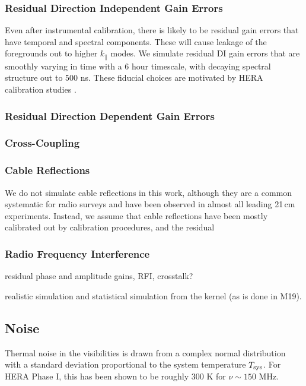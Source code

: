 \documentclass[a4paper,fleqn,usenatbib]{mnras}
\def\kpara{k_{\parallel}}
\begin{document}
\subsubsection{Residual Direction Independent Gain Errors}
Even after instrumental calibration, there is likely to be residual gain errors that have temporal and spectral components.
These will cause leakage of the foregrounds out to higher $\kpara$ modes.
We simulate residual DI gain errors that are smoothly varying in time with a 6 hour timescale, with decaying spectral structure out to 500 ns.
These fiducial choices are motivated by HERA calibration studies \citep{Kern2020a, Kern2020b}.


\subsubsection{Residual Direction Dependent Gain Errors}


\subsubsection{Cross-Coupling}


\subsubsection{Cable Reflections}
We do not simulate cable reflections in this work, although they are a common systematic for radio surveys and have been observed in almost all leading 21\,cm experiments.
Instead, we assume that cable reflections have been mostly calibrated out by calibration procedures, and the residual


\subsubsection{Radio Frequency Interference}


residual phase and amplitude gains, RFI, crosstalk?

realistic simulation and statistical simulation from the kernel (as is done in M19).


\subsection{Noise}
Thermal noise in the visibilities is drawn from a complex normal distribution with a standard deviation proportional to the system temperature $T_{\rm sys}$.
For HERA Phase I, this has been shown to be roughly 300 K for $\nu\sim150$ MHz.
\end{document}
